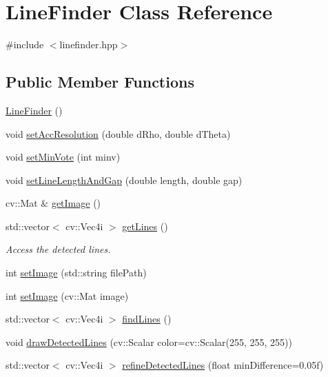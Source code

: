 \hypertarget{classLineFinder}{\section{Line\-Finder Class Reference}
\label{classLineFinder}
}


{\ttfamily \#include $<$linefinder.\-hpp$>$}

\subsection*{Public Member Functions}
\begin{DoxyCompactItemize}
\item 
\hyperlink{classLineFinder_ac9a83317df7ff3d74a9add150962e849}{Line\-Finder} ()
\item 
void \hyperlink{classLineFinder_a4ffb60e7c12143a6824b884239243da9}{set\-Acc\-Resolution} (double d\-Rho, double d\-Theta)
\item 
void \hyperlink{classLineFinder_af76de2e78cc28b37fd15652e2967e56b}{set\-Min\-Vote} (int minv)
\item 
void \hyperlink{classLineFinder_a7655dc9adfaca75ed92c585d226a60df}{set\-Line\-Length\-And\-Gap} (double length, double gap)
\item 
cv\-::\-Mat \& \hyperlink{classLineFinder_abd5e230f01feaecbc0f138ee3da504bf}{get\-Image} ()
\item 
std\-::vector$<$ cv\-::\-Vec4i $>$ \hyperlink{classLineFinder_a2769bdd5845ce23539d6abce15aa0814}{get\-Lines} ()
\begin{DoxyCompactList}\small\item\em Access the detected lines. \end{DoxyCompactList}\item 
int \hyperlink{classLineFinder_a238c97d0b07eae22b1dcce4201309771}{set\-Image} (std\-::string file\-Path)
\item 
int \hyperlink{classLineFinder_a798b342c3ac2cc0f20145b16761ff701}{set\-Image} (cv\-::\-Mat image)
\item 
std\-::vector$<$ cv\-::\-Vec4i $>$ \hyperlink{classLineFinder_a7f516bf30904fa0037d19ab1d6306c15}{find\-Lines} ()
\item 
void \hyperlink{classLineFinder_a538e8d3ab154e53bdbe379f55c322530}{draw\-Detected\-Lines} (cv\-::\-Scalar color=cv\-::\-Scalar(255, 255, 255))
\item 
std\-::vector$<$ cv\-::\-Vec4i $>$ \hyperlink{classLineFinder_a4fe5f72054ba400611549ea25c25904e}{refine\-Detected\-Lines} (float min\-Difference=0.\-05f)

\end{DoxyCompactItemize}
